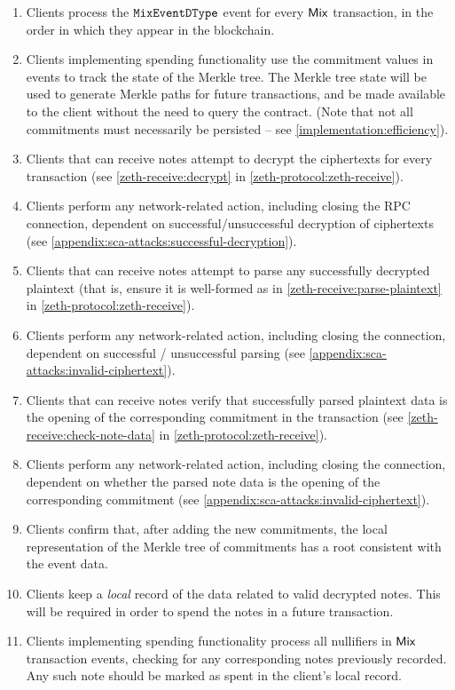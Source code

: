 \begin{enumerate}
    \item Clients \MUST{} process the ${\mathtt{MixEventDType}}$ event for every $\mathsf{Mix}$ transaction, in the order in which they appear in the blockchain.
    \item Clients implementing spending functionality \MUST{} use the commitment values in events to track the state of the Merkle tree. The Merkle tree state will be used to generate Merkle paths for future transactions, and \MUST{} be made available to the client without the need to query the contract. (Note that not all commitments must necessarily be persisted -- see \cref{implementation:efficiency}).
    \item Clients that can receive notes \MUST{} attempt to decrypt the ciphertexts for every transaction (see \cref{zeth-receive:decrypt} in \cref{zeth-protocol:zeth-receive}).
    \item Clients \MUSTNOT{} perform any network-related action, including closing the RPC connection, dependent on successful/unsuccessful decryption of ciphertexts (see \cref{appendix:sca-attacks:successful-decryption}).
    \item Clients that can receive notes \MUST{} attempt to parse any successfully decrypted plaintext (that is, ensure it is well-formed as in \cref{zeth-receive:parse-plaintext} in \cref{zeth-protocol:zeth-receive}).
    \item Clients \MUSTNOT{} perform any network-related action, including closing the connection, dependent on successful / unsuccessful parsing (see \cref{appendix:sca-attacks:invalid-ciphertext}).
    \item Clients that can receive notes \MUST{} verify that successfully parsed plaintext data is the opening of the corresponding commitment in the transaction (see \cref{zeth-receive:check-note-data} in \cref{zeth-protocol:zeth-receive}).
    \item Clients \MUSTNOT{} perform any network-related action, including closing the connection, dependent on whether the parsed note data is the opening of the corresponding commitment (see \cref{appendix:sca-attacks:invalid-ciphertext}).
    \item Clients \MUST{} confirm that, after adding the new commitments, the local representation of the Merkle tree of commitments has a root consistent with the event data.
    \item Clients \SHOULD{} keep a \emph{local} record of the data related to valid decrypted notes. This will be required in order to spend the notes in a future transaction.
    \item Clients implementing spending functionality \SHOULD{} process all nullifiers in $\mathsf{Mix}$ transaction events, checking for any corresponding notes previously recorded. Any such note should be marked as spent in the client's local record.
\end{enumerate}

